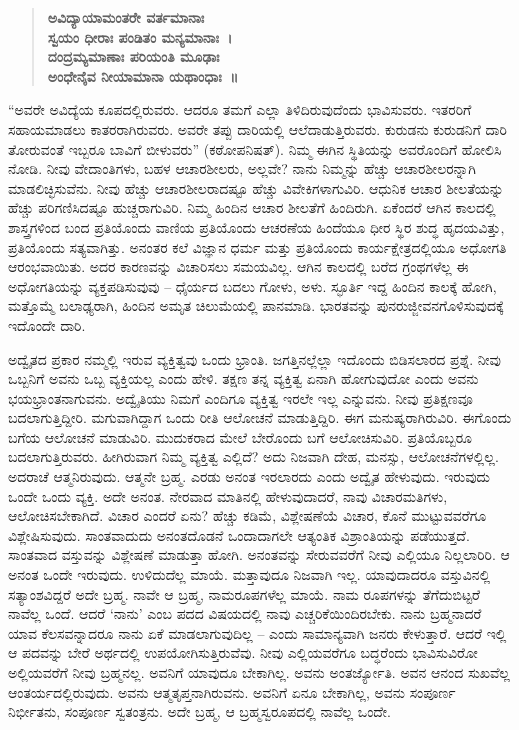\begin{verse}
\textbf{ಅವಿದ್ಯಾಯಾಮಂತರೇ ವರ್ತಮಾನಾಃ}\\\textbf{ಸ್ವಯಂ ಧೀರಾಃ ಪಂಡಿತಂ ಮನ್ಯಮಾನಾಃ~।}\\\textbf{ದಂದ್ರಮ್ಯಮಾಣಾಃ ಪರಿಯಂತಿ ಮೂಢಾಃ}\\\textbf{ಅಂಧೇನೈವ ನೀಯಾಮಾನಾ ಯಥಾಂಧಾಃ~॥}
\end{verse}

“ಅವರೇ ಅವಿದ್ಯೆಯ ಕೂಪದಲ್ಲಿರುವರು. ಆದರೂ ತಮಗೆ ಎಲ್ಲಾ ತಿಳಿದಿರುವುದೆಂದು ಭಾವಿಸುವರು. ಇತರರಿಗೆ ಸಹಾಯಮಾಡಲು ಕಾತರರಾಗಿರುವರು. ಅವರೇ ತಪ್ಪು ದಾರಿಯಲ್ಲಿ ಆಲೆದಾಡುತ್ತಿರುವರು. ಕುರುಡನು ಕುರುಡನಿಗೆ ದಾರಿ ತೋರುವಂತೆ ಇಬ್ಬರೂ ಬಾವಿಗೆ ಬೀಳುವರು” (ಕಠೋಪನಿಷತ್​). ನಿಮ್ಮ ಈಗಿನ ಸ್ಥಿತಿಯನ್ನು ಅವರೊಂದಿಗೆ ಹೋಲಿಸಿ ನೋಡಿ. ನೀವು ವೇದಾಂತಿಗಳು, ಬಹಳ ಆಚಾರಶೀಲರು, ಅಲ್ಲವೇ? ನಾನು ನಿಮ್ಮನ್ನು ಹೆಚ್ಚು ಆಚಾರಶೀಲರನ್ನಾಗಿ ಮಾಡಲಿಚ್ಛಿಸುವೆನು. ನೀವು ಹೆಚ್ಚು ಆಚಾರಶೀಲರಾದಷ್ಟೂ ಹೆಚ್ಚು ವಿವೇಕಿಗಳಾಗುವಿರಿ. ಆಧುನಿಕ ಆಚಾರ ಶೀಲತೆಯನ್ನು ಹೆಚ್ಚು ಪರಿಗಣಿಸಿದಷ್ಟೂ ಹುಚ್ಚರಾಗುವಿರಿ. ನಿಮ್ಮ ಹಿಂದಿನ ಆಚಾರ ಶೀಲತೆಗೆ ಹಿಂದಿರುಗಿ. ಏಕೆಂದರೆ ಆಗಿನ ಕಾಲದಲ್ಲಿ ಶಾಸ್ತ್ರಗಳಿಂದ ಬಂದ ಪ್ರತಿಯೊಂದು ವಾಣಿಯ ಪ್ರತಿಯೊಂದು ಆಚರಣೆಯ ಹಿಂದೆಯೂ ಧೀರ ಸ್ಥಿರ ಶುದ್ಧ ಹೃದಯವಿತ್ತು, ಪ್ರತಿಯೊಂದು ಸತ್ಯವಾಗಿತ್ತು. ಅನಂತರ ಕಲೆ ವಿಜ್ಞಾನ ಧರ್ಮ ಮತ್ತು ಪ್ರತಿಯೊಂದು ಕಾರ್ಯಕ್ಷೇತ್ರದಲ್ಲಿಯೂ ಅಧೋಗತಿ ಆರಂಭವಾಯಿತು. ಅದರ ಕಾರಣವನ್ನು ವಿಚಾರಿಸಲು ಸಮಯವಿಲ್ಲ. ಆಗಿನ ಕಾಲದಲ್ಲಿ ಬರೆದ ಗ್ರಂಥಗಳೆಲ್ಲ ಈ ಅಧೋಗತಿಯನ್ನು ವ್ಯಕ್ತಪಡಿಸುವುವು – ಧೈರ್ಯದ ಬದಲು ಗೋಳು, ಅಳು. ಸ್ಫೂರ್ತಿ ಇದ್ದ ಹಿಂದಿನ ಕಾಲಕ್ಕೆ ಹೋಗಿ, ಮತ್ತೊಮ್ಮೆ ಬಲಾಢ್ಯರಾಗಿ, ಹಿಂದಿನ ಅಮೃತ ಚಿಲುಮೆಯಲ್ಲಿ ಪಾನಮಾಡಿ. ಭಾರತವನ್ನು ಪುನರುಜ್ಜೀವನಗೊಳಿಸುವುದಕ್ಕೆ ಇದೊಂದೇ ದಾರಿ.

ಅದ್ವೈತದ ಪ್ರಕಾರ ನಮ್ಮಲ್ಲಿ ಇರುವ ವ್ಯಕ್ತಿತ್ವವು ಒಂದು ಭ್ರಾಂತಿ. ಜಗತ್ತಿನಲ್ಲೆಲ್ಲಾ ಇದೊಂದು ಬಿಡಿಸಲಾರದ ಪ್ರಶ್ನೆ. ನೀವು ಒಬ್ಬನಿಗೆ ಅವನು ಒಬ್ಬ ವ್ಯಕ್ತಿಯಲ್ಲ ಎಂದು ಹೇಳಿ. ತಕ್ಷಣ ತನ್ನ ವ್ಯಕ್ತಿತ್ವ ಏನಾಗಿ ಹೋಗುವುದೋ ಎಂದು ಅವನು ಭಯಭ್ರಾಂತನಾಗುವನು. ಅದ್ವೈತಿಯು ನಿಮಗೆ ಎಂದಿಗೂ ವ್ಯಕ್ತಿತ್ವ ಇರಲೇ ಇಲ್ಲ ಎನ್ನುವನು. ನೀವು ಪ್ರತಿಕ್ಷಣವೂ ಬದಲಾಗುತ್ತಿದ್ದೀರಿ. ಮಗುವಾಗಿದ್ದಾಗ ಒಂದು ರೀತಿ ಆಲೋಚನೆ ಮಾಡುತ್ತಿದ್ದಿರಿ. ಈಗ ಮನುಷ್ಯರಾಗಿರುವಿರಿ. ಈಗೊಂದು ಬಗೆಯ ಆಲೋಚನೆ ಮಾಡುವಿರಿ. ಮುದುಕರಾದ ಮೇಲೆ ಬೇರೊಂದು ಬಗೆ ಆಲೋಚಿಸುವಿರಿ. ಪ್ರತಿಯೊಬ್ಬರೂ ಬದಲಾಗುತ್ತಿರುವರು. ಹೀಗಿರುವಾಗ ನಿಮ್ಮ ವ್ಯಕ್ತಿತ್ವ ಎಲ್ಲಿದೆ? ಅದು ನಿಜವಾಗಿ ದೇಹ, ಮನಸ್ಸು, ಆಲೋಚನೆಗಳಲ್ಲಿಲ್ಲ. ಅದರಾಚೆ ಆತ್ಮನಿರುವುದು. ಆತ್ಮನೇ ಬ್ರಹ್ಮ. ಎರಡು ಅನಂತ ಇರಲಾರದು ಎಂದು ಅದ್ವೈತ ಹೇಳುವುದು. ಇರುವುದು ಒಂದೇ ಒಂದು ವ್ಯಕ್ತಿ. ಅದೇ ಅನಂತ. ನೇರವಾದ ಮಾತಿನಲ್ಲಿ ಹೇಳುವುದಾದರೆ, ನಾವು ವಿಚಾರಮತಿಗಳು, ಆಲೋಚಿಸಬೇಕಾಗಿದೆ. ವಿಚಾರ ಎಂದರೆ ಏನು? ಹೆಚ್ಚು ಕಡಿಮೆ, ವಿಶ್ಲೇಷಣೆಯೆ ವಿಚಾರ, ಕೊನೆ ಮುಟ್ಟುವವರೆಗೂ ವಿಶ್ಲೇಷಿಸುವುದು. ಸಾಂತವಾದುದು ಅನಂತದೊಡನೆ ಒಂದಾದಾಗಲೇ ಆತ್ಯಂತಿಕ ವಿಶ್ರಾಂತಿಯನ್ನು ಪಡೆಯುತ್ತದೆ. ಸಾಂತವಾದ ವಸ್ತುವನ್ನು ವಿಶ್ಲೇಷಣೆ ಮಾಡುತ್ತಾ ಹೋಗಿ. ಅನಂತವನ್ನು ಸೇರುವವರೆಗೆ ನೀವು ಎಲ್ಲಿಯೂ ನಿಲ್ಲಲಾರಿರಿ. ಆ ಅನಂತ ಒಂದೇ ಇರುವುದು. ಉಳಿದುದೆಲ್ಲ ಮಾಯೆ. ಮತ್ತಾವುದೂ ನಿಜವಾಗಿ ಇಲ್ಲ. ಯಾವುದಾದರೂ ವಸ್ತುವಿನಲ್ಲಿ ಸತ್ಯಾಂಶವಿದ್ದರೆ ಅದೇ ಬ್ರಹ್ಮ. ನಾವೇ ಆ ಬ್ರಹ್ಮ, ನಾಮರೂಪಗಳೆಲ್ಲ ಮಾಯೆ. ನಾಮ ರೂಪಗಳನ್ನು ತೆಗೆದುಬಿಟ್ಟರೆ ನಾವೆಲ್ಲ ಒಂದೆ. ಆದರೆ ‘ನಾನು’ ಎಂಬ ಪದದ ವಿಷಯದಲ್ಲಿ ನಾವು ಎಚ್ಚರಿಕೆಯಿಂದಿರಬೇಕು. ನಾನು ಬ್ರಹ್ಮನಾದರೆ ಯಾವ ಕೆಲಸವನ್ನಾದರೂ ನಾನು ಏಕೆ ಮಾಡಲಾಗುವುದಿಲ್ಲ – ಎಂದು ಸಾಮಾನ್ಯವಾಗಿ ಜನರು ಕೇಳುತ್ತಾರೆ. ಆದರೆ ಇಲ್ಲಿ ಆ ಪದವನ್ನು ಬೇರೆ ಅರ್ಥದಲ್ಲಿ ಉಪಯೋಗಿಸುತ್ತಿರುವೆವು. ನೀವು ಎಲ್ಲಿಯವರೆಗೂ ಬದ್ಧರೆಂದು ಭಾವಿಸುವಿರೋ ಅಲ್ಲಿಯವರೆಗೆ ನೀವು ಬ್ರಹ್ಮನಲ್ಲ. ಅವನಿಗೆ ಯಾವುದೂ ಬೇಕಾಗಿಲ್ಲ. ಅವನು ಅಂತರ್ಜ್ಯೋತಿ. ಅವನ ಆನಂದ ಸುಖವೆಲ್ಲ ಆಂತರ್ಯದಲ್ಲಿರುವುದು. ಅವನು ಆತ್ಮತೃಪ್ತನಾಗಿರುವನು. ಅವನಿಗೆ ಏನೂ ಬೇಕಾಗಿಲ್ಲ, ಅವನು ಸಂಪೂರ್ಣ ನಿರ್ಭೀತನು, ಸಂಪೂರ್ಣ ಸ್ವತಂತ್ರನು. ಅದೇ ಬ್ರಹ್ಮ, ಆ ಬ್ರಹ್ಮಸ್ವರೂಪದಲ್ಲಿ ನಾವೆಲ್ಲ ಒಂದೇ.

